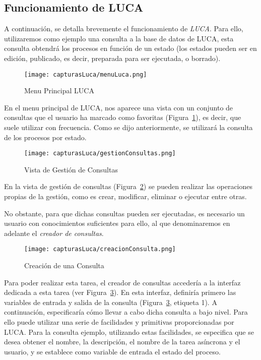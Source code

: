 \subsection{Funcionamiento de LUCA}

A continuación, se detalla brevemente el funcionamiento de \emph{LUCA}. Para ello, utilizaremos como ejemplo una consulta a la base de datos de LUCA, esta consulta obtendrá los procesos en función de un estado (los estados pueden ser en edición, publicado, es decir, preparada para ser ejecutada, o borrado).

\begin{figure}[!tb]
    \centering
 	\texttt{[image: capturasLuca/menuLuca.png]}
	\caption{Menu Principal LUCA}
    \label{fig:menuLuca}
\end{figure}

En el menu principal de LUCA, nos aparece una vista con un conjunto de consultas que el usuario ha marcado como favoritas (Figura~\ref{fig:menuLuca}), es decir, que suele utilizar con frecuencia. Como se dijo anteriormente, se utilizará la consulta de los procesos por estado.

\begin{figure}[!tb]
	\centering
	\texttt{[image: capturasLuca/gestionConsultas.png]}
	\caption{Vista de Gestión de Consultas}
	\label{fig:gestionConsultas}
\end{figure}

En la vista de gestión de consultas (Figura~\ref{fig:gestionConsultas}) se pueden realizar las operaciones propias de la gestión, como es crear, modificar, eliminar o ejecutar entre otras.

No obstante, para que dichas consultas pueden ser ejecutadas, es necesario un usuario con conocimientos suficientes para ello, al que denominaremos en adelante el \emph{creador de consultas}.

\begin{figure}[!tb]
	\centering
	\texttt{[image: capturasLuca/creacionConsulta.png]}
	\caption{Creación de una Consulta}
	\label{fig:creacionConsulta}
\end{figure}

Para poder realizar esta tarea, el creador de consultas accedería a la interfaz dedicada a esta tarea (ver Figura~\ref{fig:creacionConsulta}). En esta interfaz, definiría primero las variables de entrada y salida de la consulta (Figura~\ref{fig:creacionConsulta}, etiqueta 1). A continuación, especificaría cómo llevar a cabo dicha consulta a bajo nivel. Para ello puede utilizar una serie de facilidades y primitivas proporcionadas por LUCA. Para la consulta ejemplo, utilizando estas facilidades, se especifica que se desea obtener el nombre, la descripción, el nombre de la tarea asíncrona y el usuario, y se establece como variable de entrada el estado del proceso.

